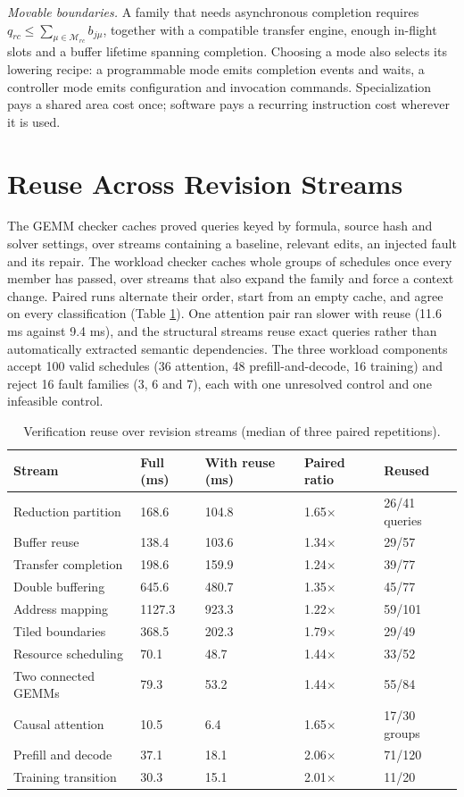 \documentclass[11pt]{article}
\begin{document}
\emph{Movable boundaries.} A family that needs asynchronous completion requires \(q_{rc}\le\sum_{\mu\in\mathcal M_{rc}}b_{j\mu}\), together with a compatible transfer engine, enough in-flight slots and a buffer lifetime spanning completion. Choosing a mode also selects its lowering recipe: a programmable mode emits completion events and waits, a controller mode emits configuration and invocation commands. Specialization pays a shared area cost once; software pays a recurring instruction cost wherever it is used.

\section{Reuse Across Revision Streams}\label{app:reuse}

The GEMM checker caches proved queries keyed by formula, source hash and solver settings, over streams containing a baseline, relevant edits, an injected fault and its repair. The workload checker caches whole groups of schedules once every member has passed, over streams that also expand the family and force a context change. Paired runs alternate their order, start from an empty cache, and agree on every classification (Table \ref{tab:streams}). One attention pair ran slower with reuse (11.6 ms against 9.4 ms), and the structural streams reuse exact queries rather than automatically extracted semantic dependencies. The three workload components accept 100 valid schedules (36 attention, 48 prefill-and-decode, 16 training) and reject 16 fault families (3, 6 and 7), each with one unresolved control and one infeasible control.

\begin{table}[H]
\small
\centering
\begin{tabular}{@{}lllll@{}}
\toprule
Stream & Full (ms) & With reuse (ms) & Paired ratio & Reused \\
\midrule
Reduction partition & 168.6 & 104.8 & 1.65\(\times\) & 26/41 queries \\
Buffer reuse & 138.4 & 103.6 & 1.34\(\times\) & 29/57 \\
Transfer completion & 198.6 & 159.9 & 1.24\(\times\) & 39/77 \\
Double buffering & 645.6 & 480.7 & 1.35\(\times\) & 45/77 \\
Address mapping & 1127.3 & 923.3 & 1.22\(\times\) & 59/101 \\
Tiled boundaries & 368.5 & 202.3 & 1.79\(\times\) & 29/49 \\
Resource scheduling & 70.1 & 48.7 & 1.44\(\times\) & 33/52 \\
Two connected GEMMs & 79.3 & 53.2 & 1.44\(\times\) & 55/84 \\
Causal attention & 10.5 & 6.4 & 1.65\(\times\) & 17/30 groups \\
Prefill and decode & 37.1 & 18.1 & 2.06\(\times\) & 71/120 \\
Training transition & 30.3 & 15.1 & 2.01\(\times\) & 11/20 \\
\bottomrule
\end{tabular}
\caption{Verification reuse over revision streams (median of three paired repetitions).}
\label{tab:streams}
\end{table}
\end{document}
